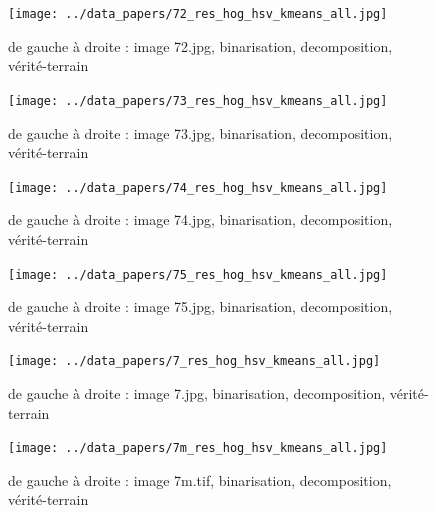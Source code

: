 \documentclass{book}
\begin{document}
\begin{figure}[H]
\begin{center}
\texttt{[image: ../data\_papers/72\_res\_hog\_hsv\_kmeans\_all.jpg]}
\end{center}
\caption{de gauche à droite : image 72.jpg, binarisation, decomposition, vérité-terrain}
\label{72}
\end{figure}
\clearpage


\begin{figure}[H]
\begin{center}
\texttt{[image: ../data\_papers/73\_res\_hog\_hsv\_kmeans\_all.jpg]}
\end{center}
\caption{de gauche à droite : image 73.jpg, binarisation, decomposition, vérité-terrain}
\label{73}
\end{figure}
\clearpage


\begin{figure}[H]
\begin{center}
\texttt{[image: ../data\_papers/74\_res\_hog\_hsv\_kmeans\_all.jpg]}
\end{center}
\caption{de gauche à droite : image 74.jpg, binarisation, decomposition, vérité-terrain}
\label{74}
\end{figure}
\clearpage


\begin{figure}[H]
\begin{center}
\texttt{[image: ../data\_papers/75\_res\_hog\_hsv\_kmeans\_all.jpg]}
\end{center}
\caption{de gauche à droite : image 75.jpg, binarisation, decomposition, vérité-terrain}
\label{75}
\end{figure}
\clearpage


\begin{figure}[H]
\begin{center}
\texttt{[image: ../data\_papers/7\_res\_hog\_hsv\_kmeans\_all.jpg]}
\end{center}
\caption{de gauche à droite : image 7.jpg, binarisation, decomposition, vérité-terrain}
\label{7}
\end{figure}
\clearpage


\begin{figure}[H]
\begin{center}
\texttt{[image: ../data\_papers/7m\_res\_hog\_hsv\_kmeans\_all.jpg]}
\end{center}
\caption{de gauche à droite : image 7m.tif, binarisation, decomposition, vérité-terrain}
\label{7m}
\end{figure}
\clearpage
\end{document}
